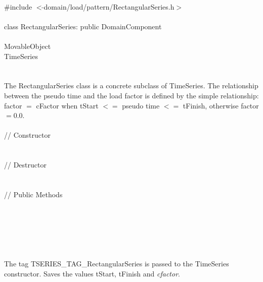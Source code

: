 
   \\
\indent \#include $<\tilde{ }$domain/load/pattern/RectangularSeries.h$>$  \\

  \\
\indent class RectangularSeries: public DomainComponent  \\

 \\
\indent MovableObject \\
\indent\indent TimeSeries \\
\indent\indent{} \\

 \\ 
\indent The RectangularSeries class is a concrete subclass of TimeSeries.
The relationship between the pseudo time and the load factor is
defined by the simple relationship: factor $=$ cFactor when tStart $<=$
pseudo time $<=$ tFinish, otherwise factor $ =0.0$. \\


 \\
\indent // Constructor \\ 
\\ \\
\indent // Destructor \\ 
\\  \\
\indent // Public Methods \\ 
\\
\\
\\
\\

 \\ 
\\ 
The tag TSERIES\_TAG\_RectangularSeries is passed to the TimeSeries
constructor. Saves the values \p tStart, \p tFinish and {\em
cfactor}. \\


